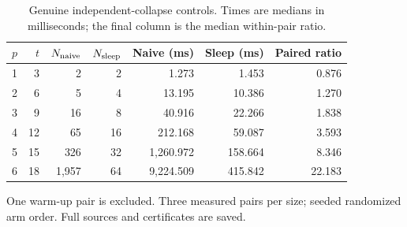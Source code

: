\begin{table}[tbp]
\centering
\small
\setlength{\tabcolsep}{4pt}
\caption{Genuine independent-collapse controls. Times are medians in milliseconds; the final column is the median within-pair ratio.}
\label{tab:geometric}
\begin{tabular}{@{}rrrrrrr@{}}
\toprule
$p$ & $t$ & $N_{\rm naive}$ & $N_{\rm sleep}$ & Naive (ms) & Sleep (ms) & Paired ratio\\
\midrule
1 & 3 & 2 & 2 & 1.273 & 1.453 & 0.876\\
2 & 6 & 5 & 4 & 13.195 & 10.386 & 1.270\\
3 & 9 & 16 & 8 & 40.916 & 22.266 & 1.838\\
4 & 12 & 65 & 16 & 212.168 & 59.087 & 3.593\\
5 & 15 & 326 & 32 & 1,260.972 & 158.664 & 8.346\\
6 & 18 & 1,957 & 64 & 9,224.509 & 415.842 & 22.183\\
\bottomrule
\end{tabular}
\par\smallskip
\begin{minipage}{0.97\textwidth}
\footnotesize One warm-up pair is excluded. Three measured pairs per size; seeded randomized arm order. Full sources and certificates are saved.
\end{minipage}
\end{table}

